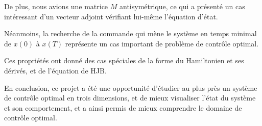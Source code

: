 \documentclass[
  french,
]{article}
\begin{document}
De plus, nous avions une matrice \(M\) antisymétrique,
ce qui a présenté un cas intéressant d'un vecteur adjoint
vérifiant lui-même l'équation d'état.

Néanmoins, la recherche de la commande qui mène le système
en temps minimal de \(x(0)\) à \(x(T)\) représente un cas
important de problème de contrôle optimal.

Ces propriétés ont donné des cas spéciales de la forme
du Hamiltonien et ses dérivés, et de l'équation de HJB.

En conclusion, ce projet a été une opportunité d'étudier
au plus près un système de contrôle optimal en trois dimensions,
et de mieux visualiser l'état du système et son comportement,
et a ainsi permis de mieux comprendre le domaine de contrôle optimal.
\end{document}
